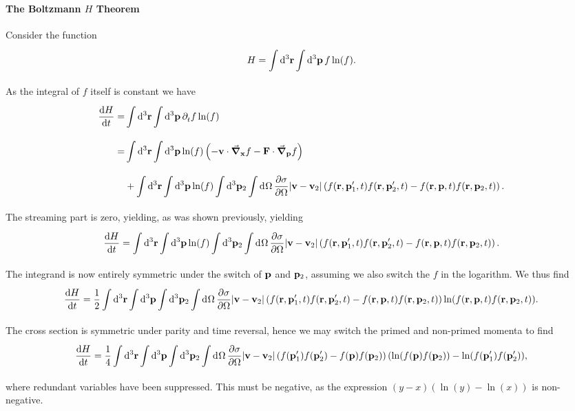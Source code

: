 \paragraph{The Boltzmann $H$ Theorem}
Consider the function
\begin{align*}
	H = \int\limits_{}^{}\dd[3]{\vb{r}}\int\limits_{}^{}\dd[3]{\vb{p}}f\ln(f).
\end{align*}
As the integral of $f$ itself is constant we have
\begin{align*}
	\dv{H}{t} =& \int\limits_{}^{}\dd[3]{\vb{r}}\int\limits_{}^{}\dd[3]{\vb{p}}\partial^{}_{t}{f}\ln(f) \\
	          =& \int\limits_{}^{}\dd[3]{\vb{r}}\int\limits_{}^{}\dd[3]{\vb{p}}\ln(f)\left(-\vb{v}\cdot\grad_{\vb{x}}{f} - \vb{F}\cdot\grad_{\vb{p}}{f}\right) \\
	           &+ \int\limits_{}^{}\dd[3]{\vb{r}}\int\limits_{}^{}\dd[3]{\vb{p}}\ln(f)\int\limits_{}^{}\dd[3]{\vb{p}_{2}}\int\limits_{}^{}\dd[]{\Omega}\pdv{\sigma}{\Omega}\abs{\vb{v} - \vb{v}_{2}}\left(f(\vb{r}, \vb{p}_{1}^{\prime}, t)f(\vb{r}, \vb{p}_{2}^{\prime}, t) - f(\vb{r}, \vb{p}, t)f(\vb{r}, \vb{p}_{2}, t)\right).
\end{align*}
The streaming part is zero, yielding, as was shown previously, yielding
\begin{align*}
	\dv{H}{t} = \int\limits_{}^{}\dd[3]{\vb{r}}\int\limits_{}^{}\dd[3]{\vb{p}}\ln(f)\int\limits_{}^{}\dd[3]{\vb{p}_{2}}\int\limits_{}^{}\dd[]{\Omega}\pdv{\sigma}{\Omega}\abs{\vb{v} - \vb{v}_{2}}\left(f(\vb{r}, \vb{p}_{1}^{\prime}, t)f(\vb{r}, \vb{p}_{2}^{\prime}, t) - f(\vb{r}, \vb{p}, t)f(\vb{r}, \vb{p}_{2}, t)\right).
\end{align*}
The integrand is now entirely symmetric under the switch of $\vb{p}$ and $\vb{p}_{2}$, assuming we also switch the $f$ in the logarithm. We thus find
\begin{align*}
	\dv{H}{t} = \frac{1}{2}\int\limits_{}^{}\dd[3]{\vb{r}}\int\limits_{}^{}\dd[3]{\vb{p}}\int\limits_{}^{}\dd[3]{\vb{p}_{2}}\int\limits_{}^{}\dd[]{\Omega}\pdv{\sigma}{\Omega}\abs{\vb{v} - \vb{v}_{2}}\left(f(\vb{r}, \vb{p}_{1}^{\prime}, t)f(\vb{r}, \vb{p}_{2}^{\prime}, t) - f(\vb{r}, \vb{p}, t)f(\vb{r}, \vb{p}_{2}, t)\right)\ln(f(\vb{r}, \vb{p}, t)f(\vb{r}, \vb{p}_{2}, t)).
\end{align*}
The cross section is symmetric under parity and time reversal, hence we may switch the primed and non-primed momenta to find
\begin{align*}
	\dv{H}{t} = \frac{1}{4}\int\limits_{}^{}\dd[3]{\vb{r}}\int\limits_{}^{}\dd[3]{\vb{p}}\int\limits_{}^{}\dd[3]{\vb{p}_{2}}\int\limits_{}^{}\dd[]{\Omega}\pdv{\sigma}{\Omega}\abs{\vb{v} - \vb{v}_{2}}\left(f(\vb{p}_{1}^{\prime})f(\vb{p}_{2}^{\prime}) - f(\vb{p})f(\vb{p}_{2})\right)(\ln(f(\vb{p})f(\vb{p}_{2})) - \ln(f(\vb{p}_{1}^{\prime})f(\vb{p}_{2}^{\prime})),
\end{align*}
where redundant variables have been suppressed. This must be negative, as the expression $(y - x)(\ln(y) -\ln(x))$ is non-negative.

